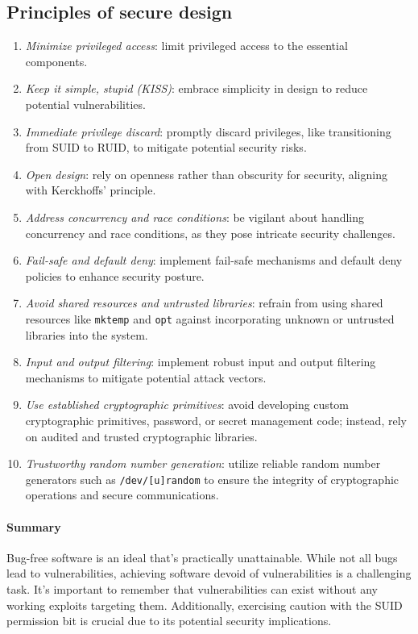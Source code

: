 \subsection{Principles of secure design}
\begin{enumerate}
    \item \textit{Minimize privileged access}: limit privileged access to the essential components.
    \item \textit{Keep it simple, stupid (KISS)}: embrace simplicity in design to reduce potential vulnerabilities.
    \item \textit{Immediate privilege discard}: promptly discard privileges, like transitioning from SUID to RUID, to mitigate potential security risks.
    \item \textit{Open design}: rely on openness rather than obscurity for security, aligning with Kerckhoffs' principle.
    \item \textit{Address concurrency and race conditions}: be vigilant about handling concurrency and race conditions, as they pose intricate security challenges.
    \item \textit{Fail-safe and default deny}: implement fail-safe mechanisms and default deny policies to enhance security posture.
    \item \textit{Avoid shared resources and untrusted libraries}: refrain from using shared resources like \texttt{mktemp} and \texttt{opt} against incorporating unknown or untrusted libraries into the system.
    \item \textit{Input and output filtering}: implement robust input and output filtering mechanisms to mitigate potential attack vectors.
    \item \textit{Use established cryptographic primitives}: avoid developing custom cryptographic primitives, password, or secret management code; instead, rely on audited and trusted cryptographic libraries.
    \item \textit{Trustworthy random number generation}: utilize reliable random number generators such as \texttt{/dev/[u]random} to ensure the integrity of cryptographic operations and secure communications.
\end{enumerate}

\paragraph*{Summary}
Bug-free software is an ideal that's practically unattainable. 
While not all bugs lead to vulnerabilities, achieving software devoid of vulnerabilities is a challenging task.
It's important to remember that vulnerabilities can exist without any working exploits targeting them.
Additionally, exercising caution with the SUID permission bit is crucial due to its potential security implications.